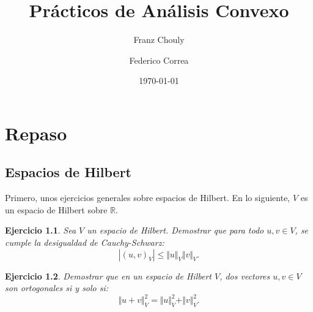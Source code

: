 \documentclass[11pt]{report}
\title{Prácticos de Análisis Convexo}
\author{Franz Chouly \and Federico Correa}
\date{\today}
\newtheorem{ex}{Ejercicio}
\newenvironment{solution}{\begin{proof}[Solución]}{\end{proof}}
\newcommand{\inner}[2]{( #1, #2 )_V}
\newcommand{\norma}[1]{\Vert #1 \Vert_V}
\begin{document}
\maketitle
\tableofcontents


\chapter{Repaso}

\section{Espacios de Hilbert}

\noindent
Primero, unos ejercicios generales sobre espacios de Hilbert. En lo siguiente, $V$ es un espacio de Hilbert sobre $\mathbb{R}$.

\begin{ex}
Sea $V$ un espacio de Hilbert. Demostrar que para todo $u, v \in V$, se cumple la desigualdad de Cauchy-Schwarz:
\begin{equation*}
|\inner{u}{v}| \leq \norma{u} \norma{v}.
\end{equation*}
\end{ex}


\begin{ex}
Demostrar que en un espacio de Hilbert $V$, dos vectores $u, v \in V$ son ortogonales si y solo si:
\begin{equation*}
\norma{u + v}^2 = \norma{u}^2 + \norma{v}^2.
\end{equation*}
\end{ex}
\end{document}
